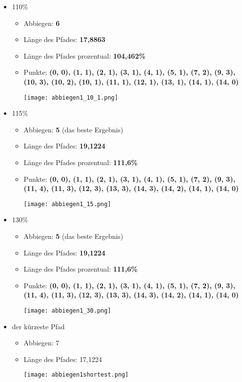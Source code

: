 \documentclass[a4paper,10pt,ngerman]{scrartcl}
\begin{document}
\begin{itemize}
  \item 110\%    
    \begin{itemize}
      \item Abbiegen: \textbf{6}
      \item Länge des Pfades: \textbf{17,8863}
      \item Länge des Pfades prozentual: \textbf{104,462\%}
      \item Punkte: \textbf{(0, 0), (1, 1), (2, 1), (3, 1), (4, 1), (5, 1), (7, 2), (9, 3), 
      (10, 3), (10, 2), (10, 1), (11, 1), (12, 1), (13, 1), (14, 1), (14, 0)}
\begin{center}
\texttt{[image: abbiegen1\_10\_1.png]}
\end{center}
    \end{itemize}
  \item 115\%    
    \begin{itemize}
      \item Abbiegen: \textbf{5} (das beste Ergebnis)
      \item Länge des Pfades: \textbf{19,1224}
      \item Länge des Pfades prozentual: \textbf{111,6\%}
      \item Punkte: \textbf{(0, 0), (1, 1), (2, 1), (3, 1), (4, 1), (5, 1), (7, 2), 
      (9, 3), (11, 4), (11, 3), (12, 3), (13, 3), (14, 3), (14, 2), (14, 1), (14, 0)}
\begin{center}
\texttt{[image: abbiegen1\_15.png]}
\end{center}
    \end{itemize}
  \item 130\%    
    \begin{itemize}
      \item Abbiegen: \textbf{5} (das beste Ergebnis)
      \item Länge des Pfades: \textbf{19,1224}
      \item Länge des Pfades prozentual: \textbf{111,6\%}
      \item Punkte: \textbf{(0, 0), (1, 1), (2, 1), (3, 1), (4, 1), (5, 1), (7, 2), 
      (9, 3), (11, 4), (11, 3), (12, 3), (13, 3), (14, 3), (14, 2), (14, 1), (14, 0)}
    \begin{center}
    \texttt{[image: abbiegen1\_30.png]}
    \end{center}
    \end{itemize}
  \item der kürzeste Pfad    
    \begin{itemize}
      \item Abbiegen: 7
      \item Länge des Pfades: 17,1224
    \begin{center}
    \texttt{[image: abbiegen1shortest.png]}
    \end{center}
    \end{itemize}
\end{itemize}
\end{document}
